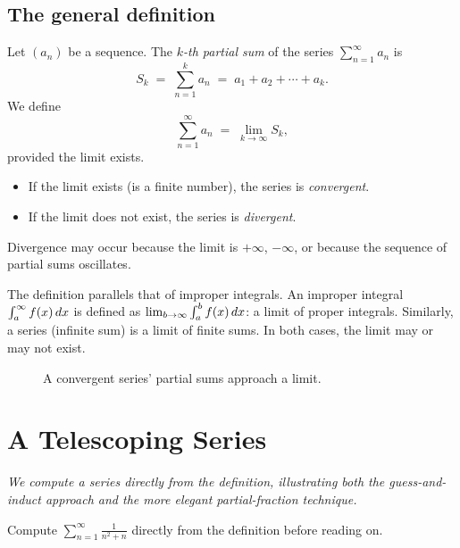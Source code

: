 \subsection*{The general definition}

\begin{definition}
\label{def:13-1}
Let $(a_{n})$ be a sequence.  The \emph{$k$-th partial sum} of the series $\sum_{n=1}^{\infty}a_{n}$ is
\[
  S_{k} \;=\; \sum_{n=1}^{k} a_{n} \;=\; a_{1}+a_{2}+\cdots+a_{k}.
\]
We define
\[
  \sum_{n=1}^{\infty}a_{n} \;=\; \lim_{k\to\infty} S_{k},
\]
provided the limit exists.
\begin{itemize}
  \item If the limit exists (is a finite number), the series is \emph{convergent}.
  \item If the limit does not exist, the series is \emph{divergent}.
\end{itemize}
Divergence may occur because the limit is $+\infty$, $-\infty$, or because the sequence of partial sums oscillates.
\end{definition}

\begin{remark}
The definition parallels that of improper integrals.  An improper integral $\int_{a}^{\infty}f(x)\,dx$ is defined as $\lim_{b\to\infty}\int_{a}^{b}f(x)\,dx$: a limit of proper integrals.  Similarly, a series (infinite sum) is a limit of finite sums.  In both cases, the limit may or may not exist.
\end{remark}

\begin{figure}[ht]
  \centering
  
  \caption{A convergent series' partial sums approach a limit.}
  \label{fig:partial-sums-converge}
\end{figure}

\section{A Telescoping Series}
\label{sec:13.3}

\textit{We compute a series directly from the definition, illustrating both the guess-and-induct approach and the more elegant partial-fraction technique.}

\begin{remark}
Compute $\displaystyle\sum_{n=1}^{\infty}\frac{1}{n^{2}+n}$ directly from the definition before reading on.
\end{remark}

